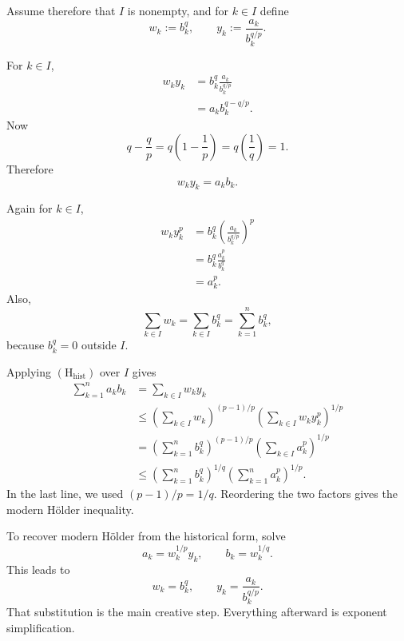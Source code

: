 \documentclass[11pt]{article}
\begin{document}
Assume therefore that \(I\) is nonempty, and for \(k\in I\) define
\[
 w_k:=b_k^q,
 \qquad
 y_k:=\frac{a_k}{b_k^{q/p}}.
 \tag{30}
\]

\begin{solutionBox}
For \(k\in I\),
\[
\begin{aligned}
 w_ky_k
 &=b_k^q\frac{a_k}{b_k^{q/p}}\\
 &=a_kb_k^{q-q/p}.
\end{aligned}
\]
Now
\[
 q-\frac{q}{p}
 =q\left(1-\frac1p\right)
 =q\left(\frac1q\right)
 =1.
 \tag{31}
\]
Therefore
\[
 w_ky_k=a_kb_k.
 \tag{32}
\]
\end{solutionBox}

\begin{solutionBox}
Again for \(k\in I\),
\[
\begin{aligned}
 w_ky_k^p
 &=b_k^q\left(\frac{a_k}{b_k^{q/p}}\right)^p\\
 &=b_k^q\frac{a_k^p}{b_k^q}\\
 &=a_k^p.
\end{aligned}
 \tag{33}
\]
Also,
\[
 \sum_{k\in I}w_k=\sum_{k\in I}b_k^q=\sum_{k=1}^{n}b_k^q,
 \tag{34}
\]
because \(b_k^q=0\) outside \(I\).
\end{solutionBox}

\begin{solutionBox}
Applying \((\mathrm{H}_{\mathrm{hist}})\) over \(I\) gives
\[
\begin{aligned}
 \sum_{k=1}^{n}a_kb_k
 &=\sum_{k\in I}w_ky_k\\
 &\leq
 \left(\sum_{k\in I}w_k\right)^{(p-1)/p}
 \left(\sum_{k\in I}w_ky_k^p\right)^{1/p}\\
 &=
 \left(\sum_{k=1}^{n}b_k^q\right)^{(p-1)/p}
 \left(\sum_{k\in I}a_k^p\right)^{1/p}\\
 &\leq
 \left(\sum_{k=1}^{n}b_k^q\right)^{1/q}
 \left(\sum_{k=1}^{n}a_k^p\right)^{1/p}.
\end{aligned}
 \tag{35}
\]
In the last line, we used \((p-1)/p=1/q\). Reordering the two factors gives the modern H\"older inequality.
\end{solutionBox}

\begin{ideaBox}
To recover modern H\"older from the historical form, solve
\[
 a_k=w_k^{1/p}y_k,
 \qquad
 b_k=w_k^{1/q}.
\]
This leads to
\[
 \boxed{w_k=b_k^q,
 \qquad
 y_k=\frac{a_k}{b_k^{q/p}}.}
\]
That substitution is the main creative step. Everything afterward is exponent simplification.
\end{ideaBox}
\end{document}

